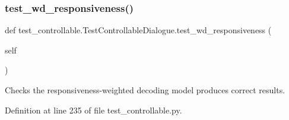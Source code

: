 \subsubsection{\texorpdfstring{test\+\_\+wd\+\_\+responsiveness()}{test\_wd\_responsiveness()}}
{\footnotesize\ttfamily def test\+\_\+controllable.\+Test\+Controllable\+Dialogue.\+test\+\_\+wd\+\_\+responsiveness (\begin{DoxyParamCaption}\item[{}]{self }\end{DoxyParamCaption})}

\begin{DoxyVerb}Checks the responsiveness-weighted decoding model produces correct results.
\end{DoxyVerb}
 

Definition at line 235 of file test\+\_\+controllable.\+py.


